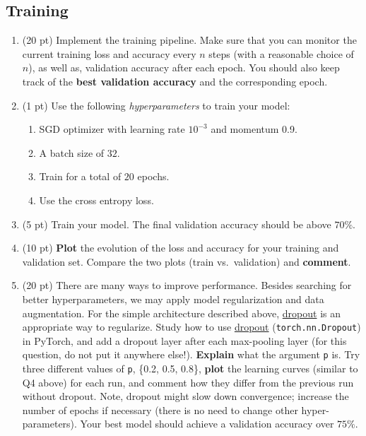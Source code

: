 \documentclass[a4paper,11pt]{article}
\begin{document}
\subsection{Training}
\begin{enumerate}
 \item (20 pt) Implement the training pipeline. Make sure that you can monitor the current training loss and accuracy every $n$ steps (with a reasonable choice of $n$), as well as, validation accuracy after each epoch.
You should also keep track of the \textbf{best validation accuracy} and the corresponding epoch.
 \item (1 pt) Use the following \textit{hyperparameters} to train your model:
 \begin{enumerate}
    \item SGD optimizer with learning rate $10^{-3}$ and momentum 0.9.
    \item A batch size of $32$.
    \item Train for a total of $20$ epochs.
    \item Use the cross entropy loss.
 \end{enumerate}

\item (5 pt) Train your model. The final validation accuracy should be above $70\%$.

\item (10 pt) \textbf{Plot} the evolution of the loss and accuracy for your training and validation set.
Compare the two plots (train vs.~validation) and \textbf{comment}.

\item (20 pt) There are many ways to improve performance. 
Besides searching for better hyperparameters, we may apply model regularization and data augmentation. For the simple architecture described above, \href{http://jmlr.org/papers/v15/srivastava14a.html}{dropout} is an appropriate way to regularize.
Study how to use  \href{https://pytorch.org/docs/stable/generated/torch.nn.Dropout.html#dropout}{dropout} (\texttt{torch.nn.Dropout}) in PyTorch, and add a dropout layer after each max-pooling layer (for this question, do not put it anywhere else!). 
\textbf{Explain} what the argument \texttt{p} is. Try three different values of \texttt{p}, \{0.2, 0.5, 0.8\}, \textbf{plot} the learning curves (similar to Q4 above) for each run, and comment how they differ from the previous run without dropout. Note, dropout might slow down convergence; increase the number of epochs if necessary (there is no need to change  other hyper-parameters). Your best model should achieve a validation accuracy over $75\%$.


\end{enumerate}
\end{document}
